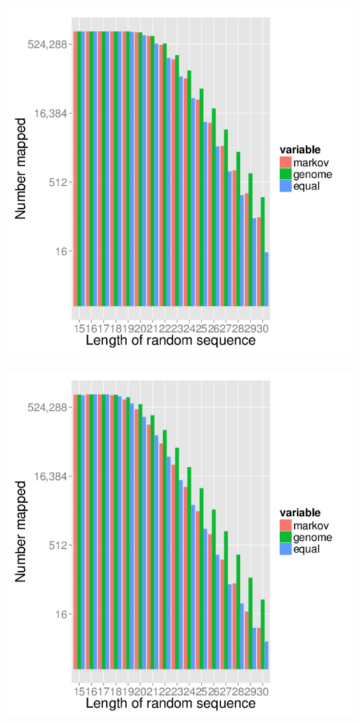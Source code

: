 \documentclass{article}
\begin{document}
\begin{figure}
\begin{subfigure}{.5\textwidth}
      \caption{}
      \label{fig:mm10_mapped}
   \end{subfigure}
   \begin{subfigure}{.5\columnwidth}
      \centering
      \includegraphics[width=.9\textwidth,natwidth=100,natheight=100]{danRer7_mapped_1000000.pdf}
      \caption{}
      \label{fig:danRer7_mapped}
   \end{subfigure}%
   \begin{subfigure}{.5\columnwidth}
      \centering
      \includegraphics[width=.9\textwidth,natwidth=100,natheight=100]{ce10_mapped_1000000.pdf}
      \caption{}
      \label{fig:ce10_mapped}
   \end{subfigure}
   \caption{}
   \label{fig:mapped_statistic}
\end{figure}
\end{document}
